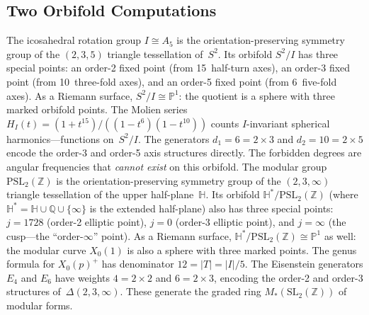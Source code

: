 \documentclass[11pt,letterpaper]{article}
\theoremstyle{definition}
\newcommand{\HH}{\mathbb{H}}
\newcommand{\ZZ}{\mathbb{Z}}
\newcommand{\QQ}{\mathbb{Q}}
\newcommand{\abs}[1]{\lvert #1 \rvert}
\begin{document}
\subsection{Two Orbifold Computations}\label{sec:orbifolds}
The icosahedral rotation group $I\cong A_5$ is the orientation-preserving symmetry group of the $(2,3,5)$ triangle tessellation of~$S^2$.  Its orbifold $S^2/I$ has three special points: an order-2 fixed point (from 15~half-turn axes), an order-3 fixed point (from 10~three-fold axes), and an order-5 fixed point (from 6~five-fold axes).  As a Riemann surface, $S^2/I\cong\mathbb{P}^1$: the quotient is a sphere with three marked orbifold points.  The Molien series $H_I(t)=(1+t^{15})/((1-t^6)(1-t^{10}))$ counts $I$-invariant spherical harmonics---functions on~$S^2/I$.  The generators $d_1=6=2\times3$ and $d_2=10=2\times5$ encode the order-3 and order-5 axis structures directly.  The forbidden degrees are angular frequencies that \emph{cannot exist} on this orbifold.
The modular group $\mathrm{PSL}_2(\ZZ)$ is the orientation-preserving symmetry group of the $(2,3,\infty)$ triangle tessellation of the upper half-plane~$\HH$.  Its orbifold $\HH^*/\mathrm{PSL}_2(\ZZ)$ (where $\HH^*=\HH\cup\QQ\cup\{\infty\}$ is the extended half-plane) also has three special points: $j=1728$ (order-2 elliptic point), $j=0$ (order-3 elliptic point), and $j=\infty$ (the cusp---the ``order-$\infty$'' point).  As a Riemann surface, $\HH^*/\mathrm{PSL}_2(\ZZ)\cong\mathbb{P}^1$ as well: the modular curve $X_0(1)$ is also a sphere with three marked points.
The genus formula for $X_0(p)^+$ has denominator $12=\abs{T}=\abs{I}/5$.  The Eisenstein generators $E_4$ and $E_6$ have weights $4=2\times2$ and $6=2\times3$, encoding the order-2 and order-3 structures of~$\Delta(2,3,\infty)$.  These generate the graded ring $M_*(\mathrm{SL}_2(\ZZ))$ of modular forms.
\end{document}
